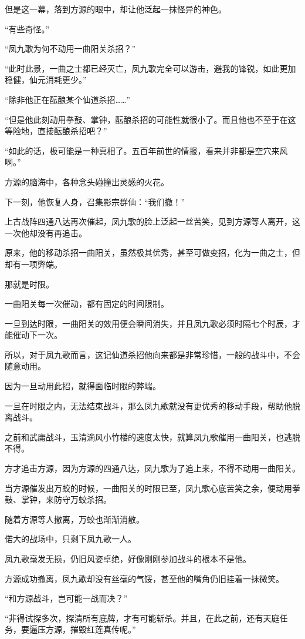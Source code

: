 \begin{this_body}
但是这一幕，落到方源的眼中，却让他泛起一抹怪异的神色。

“有些奇怪。”

“凤九歌为何不动用一曲阳关杀招？”

“此时此景，一曲之士都已经灭亡，凤九歌完全可以游击，避我的锋锐，如此更加稳健，仙元消耗更少。”

“除非他正在酝酿某个仙道杀招……”

“但是他此刻动用拳鼓、掌钟，酝酿杀招的可能性就很小了。而且他也不至于在这等险地，直接酝酿杀招吧？”

“如此的话，极可能是一种真相了。五百年前世的情报，看来并非都是空穴来风啊。”

方源的脑海中，各种念头碰撞出灵感的火花。

下一刻，他恢复人身，召集影宗群仙：“我们撤！”

上古战阵四通八达再次催起，凤九歌的脸上泛起一丝苦笑，见到方源等人离开，这一次他却没有再追击。

原来，他的移动杀招一曲阳关，虽然极其优秀，甚至可做变招，化为一曲之士，但却有一项弊端。

那就是时限。

一曲阳关每一次催动，都有固定的时间限制。

一旦到达时限，一曲阳关的效用便会瞬间消失，并且凤九歌必须时隔七个时辰，才能催动下一次。

所以，对于凤九歌而言，这记仙道杀招他向来都是非常珍惜，一般的战斗中，不会随意动用。

因为一旦动用此招，就得面临时限的弊端。

一旦在时限之内，无法结束战斗，那么凤九歌就没有更优秀的移动手段，帮助他脱离战斗。

之前和武庸战斗，玉清滴风小竹楼的速度太快，就算凤九歌催用一曲阳关，也逃脱不得。

方才追击方源，因为方源的四通八达，凤九歌为了追上来，不得不动用一曲阳关。

当方源催发出万蛟的时候，一曲阳关的时限已至，凤九歌心底苦笑之余，便动用拳鼓、掌钟，来防守万蛟杀招。

随着方源等人撤离，万蛟也渐渐消散。

偌大的战场中，只剩下凤九歌一人。

凤九歌毫发无损，仍旧风姿卓绝，好像刚刚参加战斗的根本不是他。

方源成功撤离，凤九歌却没有丝毫的气馁，甚至他的嘴角仍旧挂着一抹微笑。

“和方源战斗，岂可能一战而决？”

“非得试探多次，探清所有底牌，才有可能斩杀。并且，在此之前，还有天庭任务，要逼压方源，摧毁红莲真传呢。”


\end{this_body}
